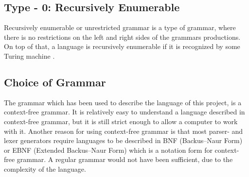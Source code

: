 \subsection{Type - 0: Recursively Enumerable}
Recursively enumerable or unrestricted grammar is a type of grammar, where there is no restrictions on the left and right sides of the grammars productions. On top of that, a language is recursively enumerable if it is recognized by some Turing machine \citep{sipser}.  %

\subsection{Choice of Grammar}
The grammar which has been used to describe the language of this project, is a context-free grammar. It is relatively easy to understand a language described in context-free grammar, but it is still strict enough to allow a computer to work with it. Another reason for using context-free grammar is that most parser- and lexer generators require languages to be described in BNF (Backus–Naur Form) or EBNF (Extended Backus–Naur Form) which is a notation form for context-free grammar. A regular grammar would not have been sufficient, due to the complexity of the language.
